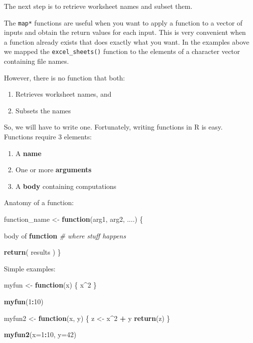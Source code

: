 \documentclass[
]{book}
\newenvironment{Shaded}{\begin{snugshade}}{\end{snugshade}}
\newcommand{\CommentTok}[1]{\textcolor[rgb]{0.56,0.35,0.01}{\textit{#1}}}
\newcommand{\ControlFlowTok}[1]{\textcolor[rgb]{0.13,0.29,0.53}{\textbf{#1}}}
\newcommand{\DataTypeTok}[1]{\textcolor[rgb]{0.13,0.29,0.53}{#1}}
\newcommand{\DecValTok}[1]{\textcolor[rgb]{0.00,0.00,0.81}{#1}}
\newcommand{\KeywordTok}[1]{\textcolor[rgb]{0.13,0.29,0.53}{\textbf{#1}}}
\newcommand{\NormalTok}[1]{#1}
\newcommand{\OperatorTok}[1]{\textcolor[rgb]{0.81,0.36,0.00}{\textbf{#1}}}
\newcommand{\StringTok}[1]{\textcolor[rgb]{0.31,0.60,0.02}{#1}}
\providecommand{\tightlist}{%
  \setlength{\itemsep}{0pt}\setlength{\parskip}{0pt}}
\begin{document}
The next step is to retrieve worksheet names and subset them.

The \texttt{map*} functions are useful when you want to apply a function to a
vector of inputs and obtain the return values for each input. This
is very convenient when a function already exists that does exactly what you
want. In the examples above we mapped the \texttt{excel\_sheets()} function to
the elements of a character vector containing file names.

However, there is no function that both:

\begin{enumerate}
\def\labelenumi{\arabic{enumi}.}
\tightlist
\item
  Retrieves worksheet names, and
\item
  Subsets the names
\end{enumerate}

So, we will have to write one. Fortunately, writing functions in R is easy.
Functions require 3 elements:

\begin{enumerate}
\def\labelenumi{\arabic{enumi}.}
\tightlist
\item
  A \textbf{name}
\item
  One or more \textbf{arguments}
\item
  A \textbf{body} containing computations
\end{enumerate}

Anatomy of a function:

\begin{Shaded}
\begin{Highlighting}[]
\NormalTok{function_name <-}\StringTok{ }\ControlFlowTok{function}\NormalTok{(arg1, arg2, ....) \{}
  
\NormalTok{    body of }\ControlFlowTok{function} \CommentTok{# where stuff happens }

    \KeywordTok{return}\NormalTok{( results ) }
\NormalTok{\}}
\end{Highlighting}
\end{Shaded}

Simple examples:

\begin{Shaded}
\begin{Highlighting}[]
\NormalTok{myfun <-}\StringTok{ }\ControlFlowTok{function}\NormalTok{(x) \{}
\NormalTok{  x}\OperatorTok{^}\DecValTok{2}
\NormalTok{\}}

\KeywordTok{myfun}\NormalTok{(}\DecValTok{1}\OperatorTok{:}\DecValTok{10}\NormalTok{)}

\NormalTok{myfun2 <-}\StringTok{ }\ControlFlowTok{function}\NormalTok{(x, y) \{}
\NormalTok{  z <-}\StringTok{ }\NormalTok{x}\OperatorTok{^}\DecValTok{2} \OperatorTok{+}\StringTok{ }\NormalTok{y}
  \KeywordTok{return}\NormalTok{(z)}
\NormalTok{\}}

\KeywordTok{myfun2}\NormalTok{(}\DataTypeTok{x=}\DecValTok{1}\OperatorTok{:}\DecValTok{10}\NormalTok{, }\DataTypeTok{y=}\DecValTok{42}\NormalTok{)}
\end{Highlighting}
\end{Shaded}
\end{document}

